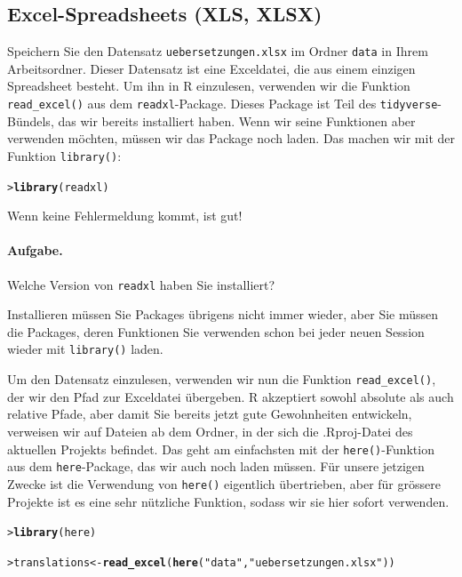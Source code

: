 \documentclass[oneside, 10pt]{book}\usepackage[]{graphicx}\usepackage[]{xcolor}
\makeatletter
\newcommand{\hlstr}[1]{\textcolor[rgb]{0.192,0.494,0.8}{#1}}%
\newcommand{\hlstd}[1]{\textcolor[rgb]{0.345,0.345,0.345}{#1}}%
\newcommand{\hlkwb}[1]{\textcolor[rgb]{0.69,0.353,0.396}{#1}}%
\newcommand{\hlkwd}[1]{\textcolor[rgb]{0.737,0.353,0.396}{\textbf{#1}}}%
\newenvironment{kframe}{%
 \def\at@end@of@kframe{}%
 \ifinner\ifhmode%
  \def\at@end@of@kframe{\end{minipage}}%
  \begin{minipage}{\columnwidth}%
 \fi\fi%
 \def\FrameCommand##1{\hskip\@totalleftmargin \hskip-\fboxsep
 \colorbox{shadecolor}{##1}\hskip-\fboxsep
     \hskip-\linewidth \hskip-\@totalleftmargin \hskip\columnwidth}%
 \MakeFramed {\advance\hsize-\width
   \@totalleftmargin\z@ \linewidth\hsize
   \@setminipage}}%
 {\par\unskip\endMakeFramed%
 \at@end@of@kframe}
\newenvironment{knitrout}{}{} %
\makeatother
\begin{document}
\subsection{Excel-Spreadsheets (XLS, XLSX)}
Speichern Sie den Datensatz \texttt{uebersetzungen.xlsx}
im Ordner \texttt{data} in Ihrem Arbeitsordner.
Dieser Datensatz ist eine Exceldatei, die aus einem einzigen
Spread\-sheet besteht. Um ihn in R einzulesen,
verwenden wir die Funktion \texttt{read\_excel()}
aus dem \texttt{readxl}-Package. Dieses Package ist Teil
des \texttt{tidyverse}-Bündels, das wir bereits installiert haben.
Wenn wir seine Funktionen aber verwenden möchten, müssen wir
das Package noch laden. Das machen wir mit der Funktion \texttt{library()}:
\begin{knitrout}
\color{fgcolor}\begin{kframe}
\begin{alltt}
\hlstd{> }\hlkwd{library}\hlstd{(readxl)}
\end{alltt}
\end{kframe}
\end{knitrout}

Wenn keine Fehlermeldung kommt, ist gut!

\paragraph{Aufgabe.} Welche Version von \texttt{readxl}
haben Sie installiert?

Installieren müssen Sie Packages übrigens nicht immer wieder,
aber Sie müssen die Packages, deren Funktionen Sie 
verwenden schon bei jeder neuen Session wieder
mit \texttt{library()} laden.

Um den Datensatz einzulesen, verwenden wir nun die Funktion
\texttt{read\_excel()}, der wir den Pfad zur Exceldatei übergeben.
R akzeptiert sowohl absolute als auch relative Pfade,
aber damit Sie bereits jetzt gute Gewohnheiten entwickeln,
verweisen wir auf Dateien ab dem Ordner, in der sich die .Rproj-Datei
des aktuellen Projekts befindet. Das geht am einfachsten mit der \texttt{here()}-Funktion aus dem \texttt{here}-Package, das wir auch noch laden müssen.
Für unsere jetzigen Zwecke ist die Verwendung von \texttt{here()}
eigentlich übertrieben, aber für grössere Projekte ist es eine
sehr nützliche Funktion, sodass wir sie hier sofort verwenden.
\begin{knitrout}
\color{fgcolor}\begin{kframe}
\begin{alltt}
\hlstd{> }\hlkwd{library}\hlstd{(here)}
\end{alltt}


{\ttfamily\noindent\itshape\color{messagecolor}{here() starts at /home/jan/ownCloud/statintro}}\begin{alltt}
\hlstd{> }\hlstd{translations} \hlkwb{<-} \hlkwd{read_excel}\hlstd{(}\hlkwd{here}\hlstd{(}\hlstr{"data"}\hlstd{,} \hlstr{"uebersetzungen.xlsx"}\hlstd{))}
\end{alltt}
\end{kframe}
\end{knitrout}
\end{document}
